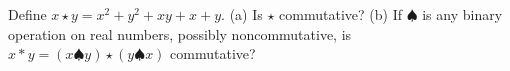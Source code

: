 Define $x\star y=x^2+y^2+xy+x+y$. (a) Is $\star$ commutative? (b) If $\spadesuit$ is any binary operation on real numbers, possibly noncommutative, is $x*y=(x\spadesuit y)\star(y\spadesuit x)$ commutative?
